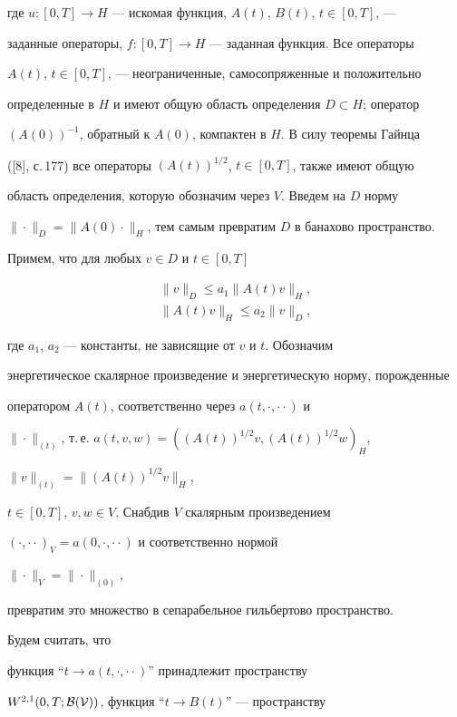 где $u:[0,T]\to H$ --- искомая функция, $A(t)$, $B(t)$, $t\in[0,T]$, ---


заданные операторы, $f:[0,T]\to H$ --- заданная функция. Все операторы


$A(t)$, $t\in[0,T]$, --- неограниченные, самосопряженные и положительно


определенные в $H$ и имеют общую область определения $D\subset H$; оператор


$(A(0))^{-1}$, обратный к $A(0)$, компактен в $H$. В силу теоремы Гайнца


([8], с.\,177) все операторы $(A(t))^{1/2}$, $t\in[0,T]$, также имеют общую


область определения, которую обозначим через $V$. Введем на $D$ норму


$\|\cdot\|_D=\|A(0)\cdot\|_H$, тем самым превратим $D$ в банахово пространство.


Примем, что для любых $v\in D$ и $t\in[0,T]$


\begin{gather}




\|v\|_D\le a_1\|A(t)v\|_H,\\


\|A(t)v\|_H\le a_2\|v\|_D,


\end{gather}


где $a_1$, $a_2$ --- константы, не зависящие от $v$ и $t$. Обозначим


энергетическое скалярное произведение и энергетическую норму, порожденные


оператором $A(t)$, соответственно через $a(t,\cdot,\cdot\cdot)$ и


$\|\cdot\|_{(t)}$, т.\,е. $a(t,v,w)=((A(t))^{1/2}v,(A(t))^{1/2}w)_H$,


$\|v\|_{(t)}=\|(A(t))^{1/2}v\|_H$,


$t\in[0,T]$, $v,w\in V$. Снабдив $V$ скалярным произведением


$(\cdot,\cdot\cdot)_V=a(0,\cdot,\cdot\cdot)$ и соответственно нормой


$\|\cdot\|_V=\|\cdot\|_{(0)}$,


превратим это множество в сепарабельное гильбертово пространство.


Будем считать, что


функция ``$t\to a(t,\cdot,\cdot\cdot)$'' принадлежит пространству


$W^{2,1}(0,T;\cal B(V))$, функция ``$t\to B(t)$'' --- пространству


